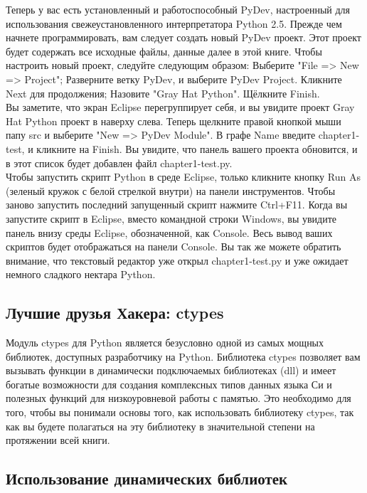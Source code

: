 \documentclass[12pt, a4paper, oneside]{book}
\begin{document}
Теперь у вас есть установленный и работоспособный PyDev, настроенный для использования свежеустановленного интерпретатора Python 2.5. Прежде чем начнете программировать, вам следует создать новый PyDev проект. Этот проект будет содержать все исходные файлы, данные далее в этой книге. Чтобы настроить новый проект, следуйте следующим образом:
Выберите "File => New => Project";
Разверните ветку PyDev, и выберите PyDev Project. Кликните Next для продолжения;
Назовите "Gray Hat Python". Щёлкните Finish.\\

Вы заметите, что экран Eclipse перегруппирует себя, и вы увидите проект Gray Hat Python проект в наверху слева. Теперь щелкните правой кнопкой мыши папу src и выберите "New => PyDev Module". В графе Name введите chapter1-test, и кликните на Finish. Вы увидите, что панель вашего проекта обновится, и в этот список будет добавлен файл chapter1-test.py.\\

Чтобы запустить скрипт Python в среде Eclipse, только кликните кнопку Run As (зеленый кружок с белой стрелкой внутри) на панели инструментов. Чтобы заново запустить последний запущенный скрипт нажмите Ctrl+F11. Когда вы запустите скрипт в Eclipse, вместо командной строки Windows, вы увидите панель внизу среды Eclipse, обозначенной, как Console. Весь вывод ваших скриптов будет отображаться на панели Console. Вы так же можете обратить внимание, что текстовый редактор уже открыл chapter1-test.py и уже ожидает немного сладкого нектара Python.\\

\subsection{Лучшие друзья Хакера: ctypes}

Модуль ctypes для Python является безусловно одной из самых мощных библиотек, доступных разработчику на Python. Библиотека ctypes позволяет вам вызывать функции в динамически подключаемых библиотеках (dll) и имеет богатые возможности для создания комплексных типов данных языка Си и полезных функций для низкоуровневой работы с памятью. Это необходимо для того, чтобы вы понимали основы того, как использовать библиотеку ctypes, так как вы будете полагаться на эту библиотеку в значительной степени на протяжении всей книги.\\

\subsection{Использование динамических библиотек}
\end{document}
